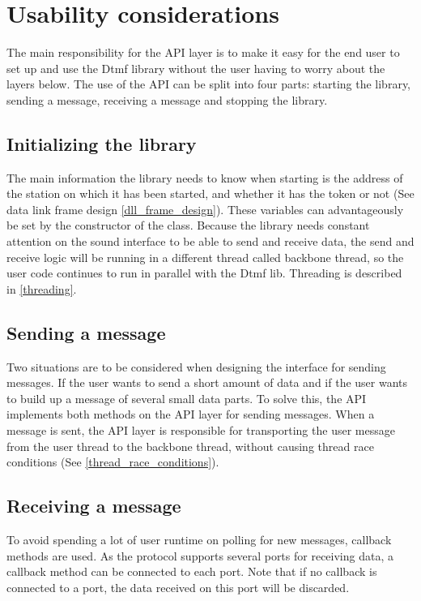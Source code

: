 \section{Usability considerations}
The main responsibility for the API layer is to make it easy for the end user to set up and use the Dtmf library without the user having to worry about the layers below. The use of the API can be split into four parts: starting the library, sending a message, receiving a message and stopping the library. 

\subsection{Initializing the library}
The main information the library needs to know when starting is the address of the station on which it has been started, and whether it has the token or not (See data link frame design \ref{dll_frame_design}). These variables can  advantageously be set by the constructor of the class. Because the library needs constant attention on the sound interface to be able to send and receive data, the send and receive logic will be running in a different thread called backbone thread, so the user code continues to run in parallel with the Dtmf lib. Threading is described in \ref{threading}.

\subsection{Sending a message}
Two situations are to be considered when designing the interface for sending messages. If the user wants to send a short amount of data and if the user wants to build up a message of several small data parts. To solve this, the API implements both methods on the API layer for sending messages. When a message is sent, the API layer is responsible for transporting the user message from the user thread to the backbone thread, without causing thread race conditions (See \ref{thread_race_conditions}).

\subsection{Receiving a message}
To avoid spending a lot of user runtime on polling for new messages, callback methods are used. As the protocol supports several ports for receiving data, a callback method can be connected to each port. Note that if no callback is connected to a port, the data received on this port will be discarded.

